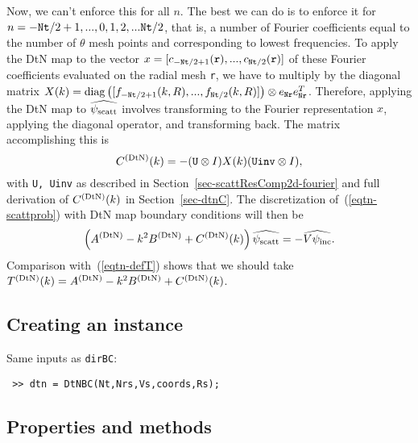 Now, we can't enforce this for all $n$. The best we can do is
to enforce it for $n = -{\tt Nt}/2 + 1, ..., 0, 1, 2, ... {\tt Nt}/2$,
that is, a number of Fourier coefficients equal to the number of
$\theta$ mesh points and corresponding to lowest frequencies.
To apply the DtN map to the vector
$x = [c_{-{\tt Nt}/2 + 1}({\tt r}), ..., c_{{\tt Nt}/2}({\tt r})]$
of these Fourier coefficients evaluated on the radial
mesh {\tt r}, we have to multiply by the diagonal matrix
$X(k) = \operatorname{diag}\left([f_{-{\tt Nt}/2 + 1}(k,R), ... , f_{{\tt Nt}/2}(k,R)]\right)
\otimes e_{{\tt Nr}} e_{{\tt Nr}}^T$. Therefore, applying
the DtN map to $\widehat{\psi_{\text{scatt}}}$ involves transforming to
the Fourier representation $x$, applying the diagonal operator, and
transforming back. The matrix accomplishing this is
\begin{equation}
 C^{(\text{DtN})}(k) = -({\tt U} \otimes I) X(k) ({\tt Uinv} \otimes I),
\end{equation}
with {\tt U, Uinv} as described in Section~\ref{sec-scattResComp2d-fourier}
and full derivation of $C^{(\text{DtN})}(k)$ in Section~\ref{sec-dtnC}.
The discretization of~(\ref{eqtn-scattprob}) with DtN map
boundary conditions will then be
\begin{equation}\label{eqtn-Tdtn}
 \left( A^{(\text{DtN})} - k^2 B^{(\text{DtN})} + C^{(\text{DtN})}(k) \right) \widehat{\psi_{\text{scatt}}} = -\widehat{V\psi_{\text{inc}}}.
\end{equation}
Comparison with~(\ref{eqtn-defT}) shows that we should take
$T^{(\text{DtN})}(k) = A^{(\text{DtN})} - k^2 B^{(\text{DtN})} + C^{(\text{DtN})}(k)$.

\subsection{Creating an instance}
\label{sec-DtNBC-create}

Same inputs as {\tt dirBC}:
\begin{verbatim}
 >> dtn = DtNBC(Nt,Nrs,Vs,coords,Rs);
\end{verbatim}

\subsection{Properties and methods}
\label{sec-DtNBC-properties}


